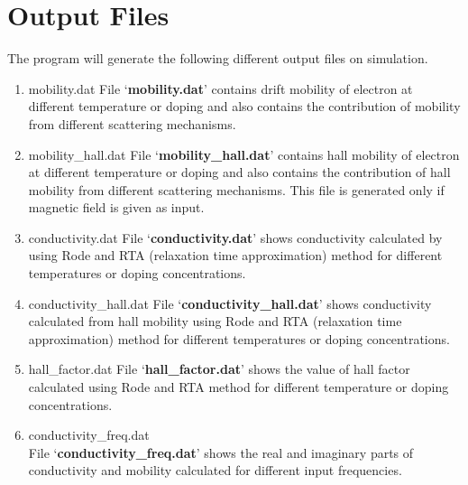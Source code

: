 \documentclass[12pt]{article}
\begin{document}
\section{Output Files}  \label{output_files}
The program will generate the following different output files on simulation.
\begin{enumerate}

\item mobility.dat
\newline File \lq \textbf{mobility.dat}\rq \hspace{0.5mm} contains drift mobility of electron at different temperature or doping and also contains the contribution of mobility from different scattering mechanisms.

\item mobility\_hall.dat
\newline File \lq \textbf{mobility\_hall.dat}\rq \hspace{0.5mm} contains hall mobility of electron at different temperature or doping and also contains the contribution of hall mobility from different scattering mechanisms. This file is generated only if magnetic field is given as input.

\item conductivity.dat
\newline File \lq \textbf{conductivity.dat}\rq \hspace{0.5mm} shows conductivity calculated by using Rode and RTA (relaxation time approximation) method for different temperatures or doping concentrations. 

\item conductivity\_hall.dat 
\newline File \lq \textbf{conductivity\_hall.dat}\rq \hspace{0.5mm} shows conductivity calculated from hall mobility using Rode and RTA (relaxation time approximation) method for different temperatures or doping concentrations. 

\item hall\_factor.dat
\newline File \lq \textbf{hall\_factor.dat}\rq \hspace{0.5mm} shows the value of hall factor calculated using Rode and RTA method for different temperature or doping concentrations.

\item conductivity\_freq.dat \\
File \lq \textbf{conductivity\_freq.dat}\rq \hspace{0.5mm} shows the real and imaginary parts of conductivity and mobility calculated for different input frequencies.


\end{enumerate}
\end{document}

